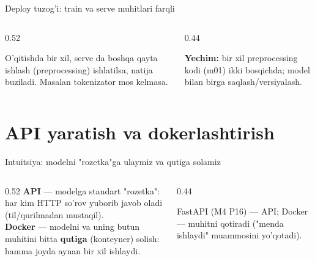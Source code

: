 \documentclass[aspectratio=169,11pt]{beamer}
\begin{document}
\begin{frame}{Deploy tuzog'i: train va serve muhitlari farqli}
  \begin{columns}[T]
    \begin{column}{0.52\textwidth}
      \begin{tcolorbox}[warnbox,title={Training-serving skew}]
        \small
        O'qitishda bir xil, serve da boshqa qayta ishlash (preprocessing)
        ishlatilsa, natija buziladi. Masalan tokenizator mos kelmasa.
      \end{tcolorbox}
    \end{column}
    \begin{column}{0.44\textwidth}
      \begin{tcolorbox}[okbox,top=2pt,bottom=2pt]
        \footnotesize
        \textbf{Yechim:} bir xil preprocessing kodi (m01) ikki bosqichda;
        model bilan birga saqlash/versiyalash.
      \end{tcolorbox}
    \end{column}
  \end{columns}
\end{frame}

\section[API va Docker]{API yaratish va dokerlashtirish}

\begin{frame}{Intuitsiya: modelni "rozetka"ga ulaymiz va qutiga solamiz}
  \begin{columns}[T]
    \begin{column}{0.52\textwidth}
      \small
      \textbf{API} --- modelga standart "rozetka": har kim HTTP so'rov yuborib
      javob oladi (til/qurilmadan mustaqil).\\[5pt]
      \textbf{Docker} --- modelni va uning butun muhitini bitta \textbf{qutiga}
      (konteyner) solish: hamma joyda aynan bir xil ishlaydi.
    \end{column}
    \begin{column}{0.44\textwidth}
      \begin{tcolorbox}[okbox,top=2pt,bottom=2pt]
        \footnotesize
        FastAPI (M4 P16) --- API; Docker --- muhitni qotiradi ("menda ishlaydi"
        muammosini yo'qotadi).
      \end{tcolorbox}
    \end{column}
  \end{columns}
\end{frame}
\end{document}
